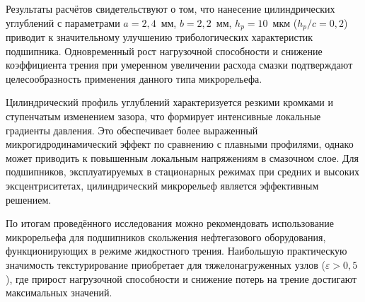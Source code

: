 Результаты расчётов свидетельствуют о том, что нанесение цилиндрических углублений с параметрами $a = 2{,}4$~мм, $b = 2{,}2$~мм, $h_p = 10$~мкм ($h_p/c = 0{,}2$) приводит к значительному улучшению трибологических характеристик подшипника. Одновременный рост нагрузочной способности и снижение коэффициента трения при умеренном увеличении расхода смазки подтверждают целесообразность применения данного типа микрорельефа.

Цилиндрический профиль углублений характеризуется резкими кромками и ступенчатым изменением зазора, что формирует интенсивные локальные градиенты давления. Это обеспечивает более выраженный микрогидродинамический эффект по сравнению с плавными профилями, однако может приводить к повышенным локальным напряжениям в смазочном слое. Для подшипников, эксплуатируемых в стационарных режимах при средних и высоких эксцентриситетах, цилиндрический микрорельеф является эффективным решением.

По итогам проведённого исследования можно рекомендовать использование \varDimpleTypeGenitive{} микрорельефа для подшипников скольжения нефтегазового оборудования, функционирующих в режиме жидкостного трения. Наибольшую практическую значимость текстурирование приобретает для тяжелонагруженных узлов ($\varepsilon > 0{,}5$), где прирост нагрузочной способности и снижение потерь на трение достигают максимальных значений.
